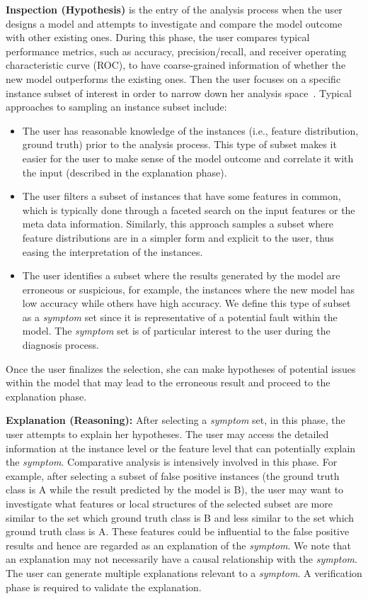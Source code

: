 \documentclass[preprint,journal]{vgtc}       %
\begin{document}
\textbf{Inspection (Hypothesis)} is the entry of the analysis process when the user designs a model and attempts to investigate and compare the model outcome with other existing ones. During this phase, the user compares typical performance metrics, such as accuracy, precision/recall, and receiver operating characteristic curve (ROC), to have coarse-grained information of whether the new model outperforms the existing ones. Then the user focuses on a specific instance subset of interest in order to narrow down her analysis space~\cite{krause2017workflow, kahng2018cti}. Typical approaches to sampling an instance subset include:
	\begin{itemize}[itemsep=0em,topsep=0pt]
  \item The user has reasonable knowledge of the instances (i.e., feature distribution, ground truth) prior to the analysis process. This type of subset makes it easier for the user to make sense of the model outcome and correlate it with the input (described in the explanation phase).
  \item The user filters a subset of instances that have some features in common, which is typically done through a faceted search on the input features or the meta data information. Similarly, this approach samples a subset where feature distributions are in a simpler form and explicit to the user,  thus easing the interpretation of the instances.
  \item The user identifies a subset where the results generated by the model are erroneous or suspicious, for example, the instances where the new model has low accuracy while others have high accuracy. We define this type of subset as a \textit{symptom} set since it is representative of a potential fault within the model. The \textit{symptom} set is of particular interest to the user during the diagnosis process.
  \end{itemize}
Once the user finalizes the selection, she can make hypotheses of potential issues within the model that may lead to the erroneous result and proceed to the explanation phase.

\textbf{Explanation (Reasoning):} After selecting a \textit{symptom} set, in this phase, the user attempts to explain her hypotheses. The user may access the detailed information at the instance level or the feature level that can potentially explain the \textit{symptom}. Comparative analysis is intensively involved in this phase. For example, after selecting a subset of false positive instances (the ground truth class is A while the result predicted by the model is B), the user may want to investigate what features or local structures of the selected subset are more similar to the set which ground truth class is B and less similar to the set which ground truth class is A. These features could be influential to the false positive results and hence are regarded as an explanation of the \textit{symptom}. We note that an explanation may not necessarily have a causal relationship with the \textit{symptom}. The user can generate multiple explanations relevant to a \textit{symptom}. A verification phase is required to validate the explanation.
\end{document}
